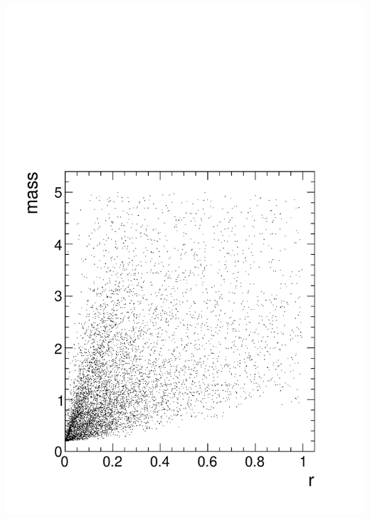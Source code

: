 \documentclass[compress]{beamer}
\begin{document}
\begin{frame}
\begin{columns}
\includegraphics[width=\linewidth]{mass_vs_r2_background.pdf}
\end{columns}
\end{frame}
\end{document}
